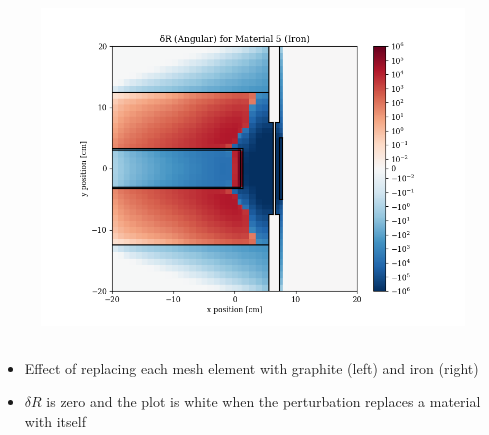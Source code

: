 \documentclass[t]{beamer}
\begin{document}
\begin{frame}
\begin{columns}
\begin{figure}
      \includegraphics[trim={0.7in 0.15in 1.05in 0.4in},clip,scale=0.36]{images/dR_angular_05.png}
    \end{figure}
  \end{columns}
  \begin{itemize}
    \item Effect of replacing each mesh element with graphite (left) and iron
          (right)
    \item $\delta R$ is zero and the plot is white when the perturbation
          replaces a material with itself
  \end{itemize}
\end{frame}
\end{document}
